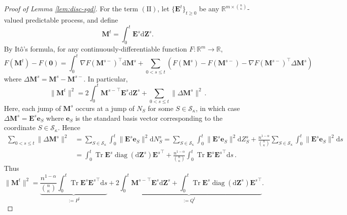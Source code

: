 \documentclass[11pt,letterpaper,reqno]{amsart}
\theoremstyle{definition}
\def\d{\mathrm{d}}
\def\R{\mathbb{R}}
\def\Tr{\operatorname{Tr}}
\def\diag{\operatorname{diag}}
\def\e{\mathbf{e}}
\def\bE{\mathbf{E}}
\def\M{\mathbf{M}}
\def\bZ{\mathbf{Z}}
\def\set{\mathscr{S}_\kappa}
\def\nII{(\mathrm{II})}
\newcommand{\norm}[1]{\|#1\|}
\begin{document}
\begin{proof}[Proof of Lemma \ref{lem:disc-sgd}]
For the term $\nII$, let $\{\bE^t\}_{t \geq 0}$ be any $\R^{m \times
\binom{n}{\kappa}}$-valued predictable process, and define
\[\M^t=\int_0^t \bE^s \d \bZ^s.\]
By It\^o's formula, for any continuously-differentiable function $F:\R^m \to
\R$,
\begin{equation}\label{eq:Ito-jump}
F(\M^t)-F(\mathbf{0})=\int_0^t \nabla F(\M^{s-})^\top \d \M^s + \sum_{0<s\leq t}
(F(\M^s)-F(\M^{s-})-\nabla F(\M^{s-})^\top \Delta \M^s)
\end{equation}
where $\Delta\M^s=\M^s-\M^{s-}$. In particular,
\[
\norm{\M^t}^2 = 2\int_0^t {\M^{s-}}^{\top}\bE^s\d\bZ^s + \sum_{0<s\leq
t}\norm{\Delta \M^s}^2\, .
\]
Here, each jump of $\M^s$ occurs at a jump of $N_S$ for some $S \in \set$, in
which case $\Delta \M^s = \bE^s \e_S$ where $\e_S$ is the standard basis
vector corresponding to the coordinate $S \in \set$. Hence
\begin{align*}
\sum_{0<s\leq t}\norm{\Delta \M^s}^2 &= \sum_{S \in \set} \int_0^t
\norm{\bE^s \e_S}^2 \d {N}^s_S = \sum_{S \in \set} \int_0^t \norm{\bE^s
\e_S}^2 \d Z^s_S + \frac{n^{1-\alpha}}{{n\choose \kappa}}\sum_{S \in \set}
\int_0^t \norm{\bE^s \e_S}^2 \d s\nonumber\\
&=\int_0^t \Tr \bE^s \diag(\d \bZ^s){\bE^s}^\top + \frac{n^{1-\alpha}}{{n\choose
\kappa}}\int_0^t \Tr \bE^s{\bE^s}^\top \d s\,.
\end{align*}
Thus
\[\|\M^t\|^2=\underbrace{\frac{n^{1-\alpha}}{{n\choose
\kappa}}\int_0^t \Tr \bE^s{\bE^s}^\top \d s}_{:=P^t}
+\underbrace{2\int_0^t {\M^{s-}}^{\top}\bE^s\d\bZ^s 
+\int_0^t \Tr \bE^s \diag(\d \bZ^s){\bE^s}^\top}_{:=Q^t}.\]


\end{proof}
\end{document}
